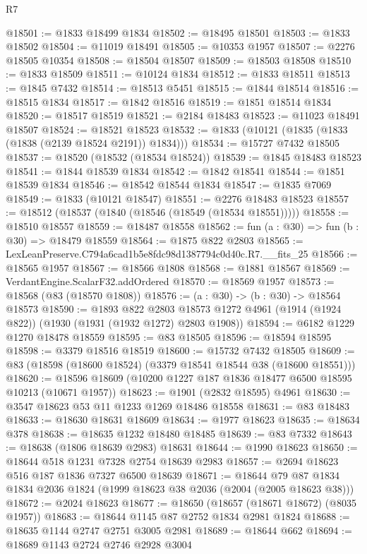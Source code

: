 \begin{lexlean}{R7}
\begin{coremodule}
@18501 := @1833 @18499 @1834
@18502 := @18495 @18501
@18503 := @1833 @18502
@18504 := @11019 @18491
@18505 := @10353 @1957
@18507 := @2276 @18505 @10354
@18508 := @18504 @18507
@18509 := @18503 @18508
@18510 := @1833 @18509
@18511 := @10124 @1834
@18512 := @1833 @18511
@18513 := @1845 @7432
@18514 := @18513 @5451
@18515 := @1844 @18514
@18516 := @18515 @1834
@18517 := @1842 @18516
@18519 := @1851 @18514 @1834
@18520 := @18517 @18519
@18521 := @2184 @18483
@18523 := @11023 @18491 @18507
@18524 := @18521 @18523
@18532 := @1833 (@10121 (@1835 (@1833 (@1838 (@2139 @18524 @2191)) @1834)))
@18534 := @15727 @7432 @18505
@18537 := @18520 (@18532 (@18534 @18524))
@18539 := @1845 @18483 @18523
@18541 := @1844 @18539 @1834
@18542 := @1842 @18541
@18544 := @1851 @18539 @1834
@18546 := @18542 @18544 @1834
@18547 := @1835 @7069
@18549 := @1833 (@10121 @18547)
@18551 := @2276 @18483 @18523
@18557 := @18512 (@18537 (@1840 (@18546 (@18549 (@18534 @18551)))))
@18558 := @18510 @18557
@18559 := @18487 @18558
@18562 := fun (a : @30) => fun (b : @30) => @18479 @18559
@18564 := @1875 @822 @2803
@18565 := LexLeanPreserve.C794a6cad1b5e8fdc98d1387794c0d40c.R7.__fits_25
@18566 := @18565 @1957
@18567 := @18566 @1808
@18568 := @1881 @18567
@18569 := VerdantEngine.ScalarF32.addOrdered
@18570 := @18569 @1957
@18573 := @18568 (@83 (@18570 @1808))
@18576 := (a : @30) -> (b : @30) -> @18564 @18573
@18590 := @1893
    @822
    @2803
    @18573
    @1272
    @4961
    (@1914 (@1924 @822))
    (@1930 (@1931 (@1932 @1272) @2803 @1908))
@18594 := @6182 @1229 @1270 @18478 @18559
@18595 := @83 @18505
@18596 := @18594 @18595
@18598 := @3379 @18516 @18519
@18600 := @15732 @7432 @18505
@18609 := @83 (@18598 (@18600 @18524) (@3379 @18541 @18544 @38 (@18600 @18551)))
@18620 := @18596 @18609 (@10200 @1227 @187 @1836 @18477 @6500 @18595 @10213 (@10671 @1957))
@18623 := @1901 (@2832 @18595) @4961
@18630 := @3547 @18623 @53 @11 @1233 @1269 @18486 @18558
@18631 := @83 @18483
@18633 := @18630 @18631 @18609
@18634 := @1977 @18623
@18635 := @18634 @378
@18638 := @18635 @1232 @18480 @18485
@18639 := @83 @7332
@18643 := @18638 (@1806 @18639 @2983) @18631
@18644 := @1990 @18623
@18650 := @18644 @518 @1231 @7328 @2754 @18639 @2983
@18657 := @2694 @18623 @516 @187 @1836 @7327 @6500 @18639
@18671 := @18644 @79 @87 @1834 @1834 @2036 @1824 (@1999 @18623 @38 @2036 (@2004 (@2005 @18623 @38)))
@18672 := @2024 @18623
@18677 := @18650 (@18657 (@18671 @18672) (@8035 @1957))
@18683 := @18644 @1145 @87 @2752 @1834 @2981 @1824
@18688 := @18635 @1144 @2747 @2751 @3005 @2981
@18689 := @18644 @662
@18694 := @18689 @1143 @2724 @2746 @2928 @3004

\end{coremodule}
\end{lexlean}
